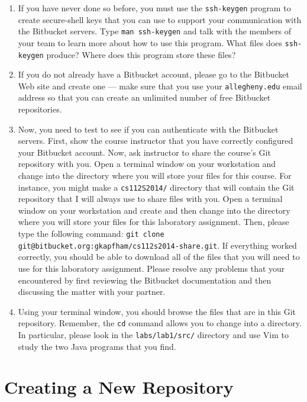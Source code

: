 \begin{enumerate}
	
  \item If you have never done so before, you must use the {\tt ssh-keygen} program to create secure-shell keys that you
    can use to support your communication with the Bitbucket servers.  Type {\tt man ssh-keygen} and talk with the
    members of your team to learn more about how to use this program.  What files does {\tt ssh-keygen} produce?  Where
    does this program store these files?

  \item If you do not already have a Bitbucket account, please go to the Bitbucket Web site and create one --- 
    make sure that you use your {\tt allegheny.edu} email address so that you can create an unlimited number of free
    Bitbucket repositories.

  \item Now, you need to test to see if you can authenticate with the Bitbucket servers.  First, show the course
    instructor that you have correctly configured your Bitbucket account.  Now, ask instructor to share the
    course's Git repository with you.  Open a terminal window on your workstation and change into the directory where
    you will store your files for this course.  For instance, you might make a {\tt cs112S2014/} directory that will
    contain the Git repository that I will always use to share files with you. Open a terminal window on your
    workstation and create and then change into the directory where you will store your files for this laboratory
    assignment.  Then, please type the following command: {\tt git clone
    git@bitbucket.org:gkapfham/cs112s2014-share.git}.  If everything worked correctly, you should be able to download
    all of the files that you will need to use for this laboratory assignment. Please resolve any problems that your
    encountered by first reviewing the Bitbucket documentation and then discussing the matter with your partner.

  \item Using your terminal window, you should browse the files that are in this Git repository. Remember,
    the {\tt cd} command allows you to change into a directory.  In particular, please look in the {\tt labs/lab1/src/}
    directory and use Vim to study the two Java programs that you find.

\end{enumerate}

\section*{Creating a New Repository}

